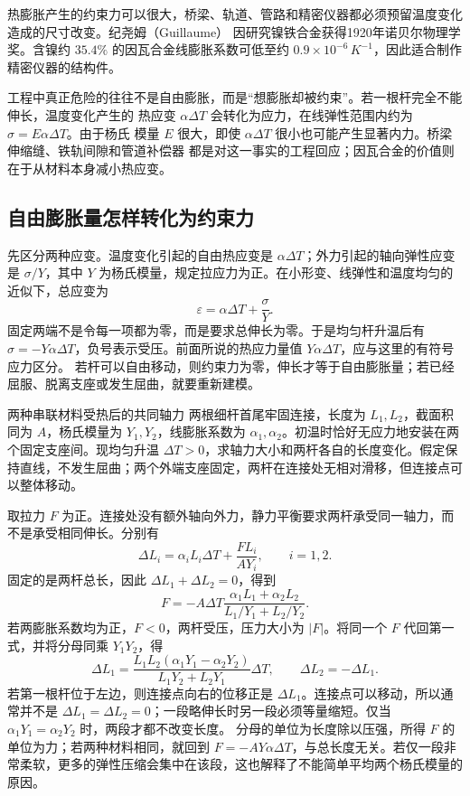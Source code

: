 {热膨胀产生的约束力可以很大，桥梁、轨道、管路和精密仪器都必须预留温度变化造成的尺寸改变。纪尧姆（Guillaume）
因研究镍铁合金获得1920年诺贝尔物理学奖。含镍约 $35.4\%$ 的因瓦合金线膨胀系数可低至约
$0.9\times10^{-6}\,\si{K^{-1}}$，因此适合制作精密仪器的结构件。

工程中真正危险的往往不是自由膨胀，而是“想膨胀却被约束”。若一根杆完全不能伸长，温度变化产生的
热应变 $\alpha\Delta T$ 会转化为应力，在线弹性范围内约为 $\sigma=E\alpha\Delta T$。由于杨氏
模量 $E$ 很大，即使 $\alpha\Delta T$ 很小也可能产生显著内力。桥梁伸缩缝、铁轨间隙和管道补偿器
都是对这一事实的工程回应；因瓦合金的价值则在于从材料本身减小热应变。

\subsection{自由膨胀量怎样转化为约束力}
先区分两种应变。温度变化引起的自由热应变是 $\alpha\Delta T$；外力引起的轴向弹性应变是 $\sigma/Y$，其中 $Y$ 为杨氏模量，规定拉应力为正。在小形变、线弹性和温度均匀的近似下，总应变为
\[
 \varepsilon=\alpha\Delta T+\frac{\sigma}{Y}.
\]
固定两端不是令每一项都为零，而是要求总伸长为零。于是均匀杆升温后有 $\sigma=-Y\alpha\Delta T$，负号表示受压。前面所说的热应力量值 $Y\alpha\Delta T$，应与这里的有符号应力区分。
若杆可以自由移动，则约束力为零，伸长才等于自由膨胀量；若已经屈服、脱离支座或发生屈曲，就要重新建模。

\Needspace{180pt}
\begin{origexamplebox}{两种串联材料受热后的共同轴力}\label{ch14:ex:teaching-composite}
两根细杆首尾牢固连接，长度为 $L_1,L_2$，截面积同为 $A$，杨氏模量为 $Y_1,Y_2$，线膨胀系数为 $\alpha_1,\alpha_2$。初温时恰好无应力地安装在两个固定支座间。现均匀升温 $\Delta T>0$，求轴力大小和两杆各自的长度变化。假定保持直线，不发生屈曲；两个外端支座固定，两杆在连接处无相对滑移，但连接点可以整体移动。

\ThQComposite
\end{origexamplebox}
\Needspace{65pt}
\begin{xesolution}
\ThAComposite

取拉力 $F$ 为正。连接处没有额外轴向外力，静力平衡要求两杆承受同一轴力，而不是承受相同伸长。分别有
\[
 \Delta L_i=\alpha_iL_i\Delta T+\frac{FL_i}{AY_i},\qquad i=1,2.
\]
固定的是两杆总长，因此 $\Delta L_1+\Delta L_2=0$，得到
\[
 F=-A\Delta T\frac{\alpha_1L_1+\alpha_2L_2}{L_1/Y_1+L_2/Y_2}.
\]
若两膨胀系数均为正，$F<0$，两杆受压，压力大小为 $|F|$。将同一个 $F$ 代回第一式，并将分母同乘 $Y_1Y_2$，得
\[
 \Delta L_1=\frac{L_1L_2(\alpha_1Y_1-\alpha_2Y_2)}{L_1Y_2+L_2Y_1}\Delta T,
 \qquad \Delta L_2=-\Delta L_1.
\]
若第一根杆位于左边，则连接点向右的位移正是 $\Delta L_1$。连接点可以移动，所以通常并不是 $\Delta L_1=\Delta L_2=0$；一段略伸长时另一段必须等量缩短。仅当 $\alpha_1Y_1=\alpha_2Y_2$ 时，两段才都不改变长度。
分母的单位为长度除以压强，所得 $F$ 的单位为力；若两种材料相同，就回到 $F=-AY\alpha\Delta T$，与总长度无关。若仅一段非常柔软，更多的弹性压缩会集中在该段，这也解释了不能简单平均两个杨氏模量的原因。
\end{xesolution}

}
